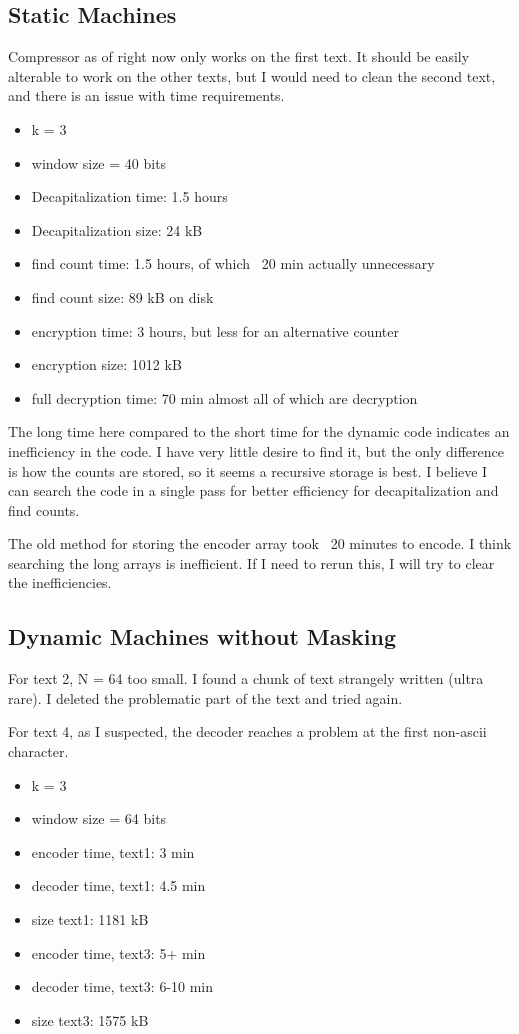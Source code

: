 \documentclass{article}
\begin{document}
\subsection{Static Machines}

Compressor as of right now only works on the first text. It should be easily alterable to work on the other texts, but I would need to clean the second text, and there is an issue with time requirements.

\begin{itemize}
\item k = 3
\item window size = 40 bits
\item Decapitalization time: 1.5 hours
\item Decapitalization size: 24 kB
\item find count time: 1.5 hours, of which ~20 min actually unnecessary
\item find count size: 89 kB on disk
\item encryption time: 3 hours, but less for an alternative counter
\item encryption size: 1012 kB
\item full decryption time: 70 min almost all of which are decryption
\end{itemize}

The long time here compared to the short time for the dynamic code indicates an inefficiency in the code. I have very little desire to find it, but the only difference is how the counts are stored, so it seems a recursive storage is best. I believe I can search the code in a single pass for better efficiency for decapitalization and find counts.

The old method for storing the encoder array took ~20 minutes to encode. I think searching the long arrays is inefficient. If I need to rerun this, I will try to clear the inefficiencies.


\subsection{Dynamic Machines without Masking}

For text 2, N = 64 too small. I found a chunk of text strangely written (ultra rare). I deleted the problematic part of the text and tried again.

For text 4, as I suspected, the decoder reaches a problem at the first non-ascii character.


\begin{itemize}
\item k = 3
\item window size = 64 bits
\item encoder time, text1: 3 min
\item decoder time, text1: 4.5 min
\item size text1: 1181 kB
\item encoder time, text3: 5+ min
\item decoder time, text3: 6-10 min
\item size text3: 1575 kB
\end{itemize}
\end{document}
